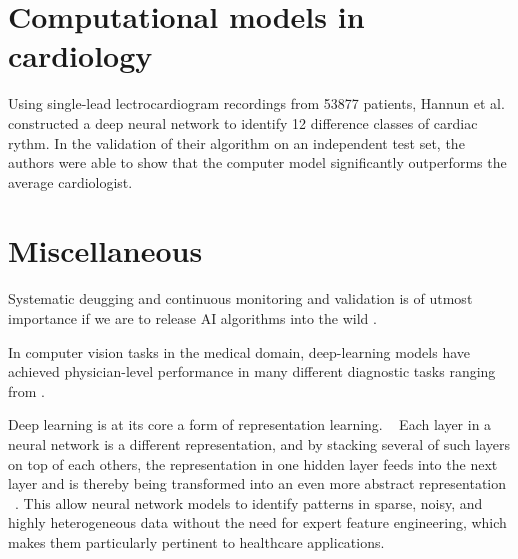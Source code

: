 \section{Computational models in cardiology}

Using single-lead lectrocardiogram recordings from \num{53877} patients,
Hannun et al.\autocite{hannunCardiologistlevel2019}
constructed a deep neural network
to identify 12 difference classes of cardiac rythm.
In the validation of their algorithm on an independent test set,
the authors were able to show that the computer model
significantly outperforms the average cardiologist. 





\section{Miscellaneous}

Systematic deugging and continuous monitoring and validation 
is of utmost importance if we are to release AI algorithms into the wild%
\autocite{topolHighperformance2019}.

In computer vision tasks in the medical domain,
deep-learning models have achieved physician-level performance
in many different diagnostic tasks
ranging from .


Deep learning is at its core a form of representation learning.
~\autocite{estevaGuide2019}
Each layer in a neural network is a different representation,
and by stacking several of such layers on top of each others,
the representation in one hidden layer
feeds into the next layer and
is thereby being transformed into an even more abstract representation%
~\autocite{estevaGuide2019}.
This allow neural network models to identify patterns in sparse, noisy,
and highly heterogeneous data without the need for expert feature engineering,
which makes them particularly pertinent to healthcare applications.%
~
